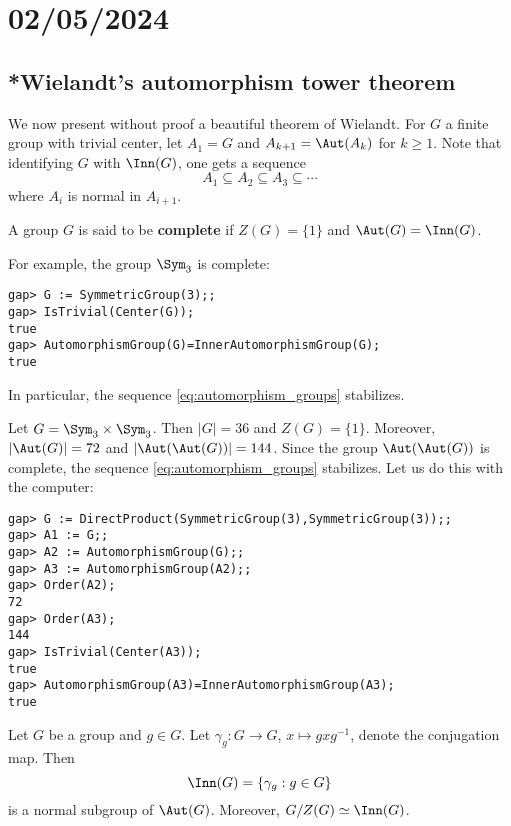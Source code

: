 \section{02/05/2024}


\subsection{*Wielandt's automorphism tower theorem}

We now present without proof a beautiful theorem of Wielandt. 
For $G$ a finite group with trivial center, let 
$A_1=G$ and $A_{k+1}=\Aut(A_k)$ for $k\geq1$. Note that 
identifying $G$ with $\Inn(G)$, one gets a sequence
\begin{equation}
\label{eq:automorphism_groups}
A_1\subseteq A_2\subseteq A_3\subseteq\cdots 
\end{equation}
where $A_i$ is normal in $A_{i+1}$. 

\begin{definition}
    A group $G$ is said to be \textbf{complete} if $Z(G)=\{1\}$ and
    $\Aut(G)=\Inn(G)$. 
\end{definition}

\begin{example}
For example, the group $\Sym_3$ is complete:
\begin{lstlisting}
gap> G := SymmetricGroup(3);;
gap> IsTrivial(Center(G));
true
gap> AutomorphismGroup(G)=InnerAutomorphismGroup(G);
true    
\end{lstlisting}
In particular, the sequence \eqref{eq:automorphism_groups}
stabilizes. 
\end{example}

\begin{example}
    Let $G=\Sym_3\times\Sym_3$. Then $|G|=36$ and $Z(G)=\{1\}$. Moreover, 
    $|\Aut(G)|=72$ and $|\Aut(\Aut(G))|=144$. Since the group
    $\Aut(\Aut(G))$ is complete, the sequence \eqref{eq:automorphism_groups} stabilizes. Let us do this 
    with the computer: 
\begin{lstlisting}
gap> G := DirectProduct(SymmetricGroup(3),SymmetricGroup(3));;
gap> A1 := G;;
gap> A2 := AutomorphismGroup(G);;
gap> A3 := AutomorphismGroup(A2);;
gap> Order(A2);
72
gap> Order(A3);
144
gap> IsTrivial(Center(A3));
true
gap> AutomorphismGroup(A3)=InnerAutomorphismGroup(A3);
true    
\end{lstlisting}
\end{example}

Let $G$ be a group and $g\in G$. Let
$\gamma_g\colon G\to G$, $x\mapsto gxg^{-1}$, denote the
conjugation map. Then 
\[
\Inn(G)=\{\gamma_g:g\in G\}
\]
is a normal subgroup of $\Aut(G)$. Moreover, $G/Z(G)\simeq\Inn(G)$. 

